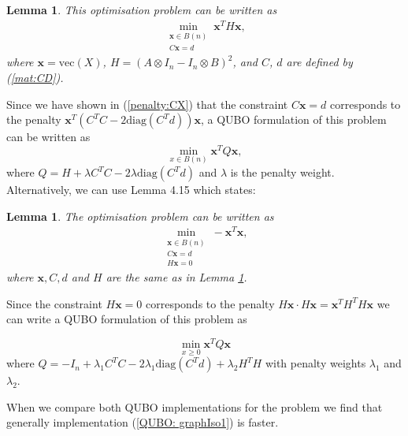 \documentclass{article}
\newtheorem{lem}[prop]{Lemma}
\begin{document}
\begin{lem}\label{lem:qubo1}
    \cite[p.~8]{klus2023continuous} This optimisation problem can be written as \begin{align*}
    \min_{\substack{\mathbf{x} \in B(n) \\ C\mathbf{x} = d}} \mathbf{x}^T H\mathbf{x},
    \end{align*}
    where \(\mathbf{x} = \text{vec}(X)\), \(H = (A \otimes I_n - I_n \otimes B)^2\), and \(C\), \(d\) are defined by (\ref{mat:CD}).
\end{lem}

\noindent Since we have shown in (\ref{penalty:CX}) that the constraint \(C\mathbf{x} = d\) corresponds to the penalty \(\mathbf{x}^T(C^T C - 2\text{diag}(C^T d))\mathbf{x}\), a QUBO formulation of this problem can be written as 
\begin{equation}\label{QUBO: graphIso1}
	\min_{x \in B(n)} \mathbf{x}^T Q \mathbf{x},
\end{equation}
where \(Q = H + \lambda C^T C - 2\lambda\text{diag}(C^T d)\) and \(\lambda\) is the penalty weight.\\

\noindent Alternatively, we can use Lemma 4.15 which states:
\begin{lem}
	\cite[p.~13]{klus2023continuous} The optimisation problem can be written as \begin{align*}
		\min_{\substack{\mathbf{x} \in B(n) \\ C\mathbf{x} = d \\ H\mathbf{x}=0}} -\mathbf{x}^T\mathbf{x},
	\end{align*}
	where \(\mathbf{x}, C, d\) and \(H\) are the same as in Lemma \ref{lem:qubo1}.
\end{lem}

\noindent Since the constraint \(H\mathbf{x} = 0\) corresponds to the penalty \(H\mathbf{x} \cdot H\mathbf{x} =  \mathbf{x}^T H^T H  \mathbf{x}\) we can write a QUBO formulation of this problem as

\begin{equation}\label{QUBO: graphIso2}
	\min_{x \geq 0} \mathbf{x}^T Q \mathbf{x}
\end{equation}
where \(Q = -I_n + \lambda_1 C^T C - 2\lambda_1\text{diag}(C^T d) + \lambda_2 H^T H\) with penalty weights \(\lambda_1\) and \(\lambda_2\).\\

\newpage

\noindent When we compare both QUBO implementations for the problem we find that generally implementation (\ref{QUBO: graphIso1}) is faster.
\end{document}
